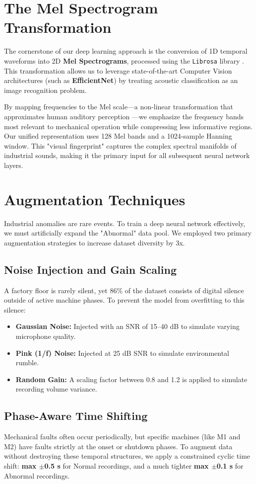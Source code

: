 \section{The Mel Spectrogram Transformation}
The cornerstone of our deep learning approach is the conversion of 1D temporal waveforms into 2D \textbf{Mel Spectrograms}, processed using the \texttt{Librosa} library \cite{librosa}. This transformation allows us to leverage state-of-the-art Computer Vision architectures (such as \textbf{EfficientNet}) by treating acoustic classification as an image recognition problem.

By mapping frequencies to the Mel scale—a non-linear transformation that approximates human auditory perception \cite{davis1980mfcc}—we emphasize the frequency bands most relevant to mechanical operation while compressing less informative regions. Our unified representation uses 128 Mel bands and a 1024-sample Hanning window. This "visual fingerprint" captures the complex spectral manifolds of industrial sounds, making it the primary input for all subsequent neural network layers.

\section{Augmentation Techniques}
Industrial anomalies are rare events. To train a deep neural network effectively, we must artificially expand the "Abnormal" data pool. We employed two primary augmentation strategies to increase dataset diversity by 3x.

\subsection{Noise Injection and Gain Scaling}
A factory floor is rarely silent, yet 86\% of the dataset consists of digital silence outside of active machine phases. To prevent the model from overfitting to this silence:
\begin{itemize}
    \item \textbf{Gaussian Noise:} Injected with an SNR of 15–40 dB to simulate varying microphone quality.
    \item \textbf{Pink (1/f) Noise:} Injected at 25 dB SNR to simulate environmental rumble.
    \item \textbf{Random Gain:} A scaling factor between 0.8 and 1.2 is applied to simulate recording volume variance.
\end{itemize}

\subsection{Phase-Aware Time Shifting}
Mechanical faults often occur periodically, but specific machines (like M1 and M2) have faults strictly at the onset or shutdown phases. To augment data without destroying these temporal structures, we apply a constrained cyclic time shift: \textbf{max $\pm$0.5 s} for Normal recordings, and a much tighter \textbf{max $\pm$0.1 s} for Abnormal recordings.

